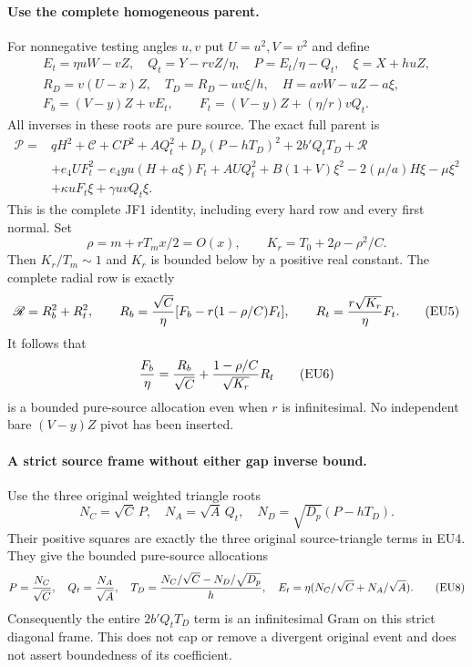 \paragraph{Use the complete homogeneous parent.}
For nonnegative testing angles $u,v$ put $U=u^2,V=v^2$ and define
\[
\begin{gathered}
 E_t=\eta uW-vZ,\quad Q_t=Y-rvZ/\eta,\quad
 P=E_t/\eta-Q_t,\quad \xi=X+huZ,\\
 R_D=v(U-x)Z,\quad T_D=R_D-uv\xi/h,\quad
 H=avW-uZ-a\xi,\\
 F_b=(V-y)Z+vE_t,\qquad
 F_t=(V-y)Z+(\eta/r)vQ_t.
\end{gathered}                                                    \tag{EU3}
\]
All inverses in these roots are pure source. The exact full parent is
\[
\begin{split}
\mathcal P={}&qH^2+\mathscr C
 +CP^2+AQ_t^2+D_p(P-hT_D)^2+2b'Q_tT_D+\mathscr R\\
 &+e_4UF_t^2-e_4yu(H+a\xi)F_t
 +AUQ_t^2+B(1+V)\xi^2-2(\mu/a)H\xi-\mu\xi^2\\
 &+\kappa uF_t\xi+\gamma uvQ_t\xi .
\end{split}                                                       \tag{EU4}
\]
This is the complete JF1 identity, including every hard row and every
first normal. Set
\[
 \rho=m+rT_mx/2=O(x),\qquad
 K_r=T_0+2\rho-\rho^2/C.
\]
Then $K_r/T_m\sim1$ and $K_r$ is bounded below by a positive
real constant. The complete radial row is exactly
\[
\mathscr R=R_b^2+R_t^2,\qquad
 R_b={\sqrt C\over\eta}[F_b-r(1-\rho/C)F_t],\qquad
 R_t={r\sqrt{K_r}\over\eta}F_t.                         \tag{EU5}
\]
It follows that
\[
 {F_b\over\eta}={R_b\over\sqrt C}
               +{1-\rho/C\over\sqrt{K_r}}R_t          \tag{EU6}
\]
is a bounded pure-source allocation even when $r$ is infinitesimal.
No independent bare $(V-y)Z$ pivot has been inserted.

\paragraph{A strict source frame without either gap inverse bound.}
Use the three original weighted triangle roots
\[
 N_C=\sqrt C\,P,\quad N_A=\sqrt A\,Q_t,\quad
 N_D=\sqrt{D_p}(P-hT_D).                               \tag{EU7}
\]
Their positive squares are exactly the three original source-triangle
terms in EU4. They give the bounded pure-source allocations
\[
 P={N_C\over\sqrt C},\quad Q_t={N_A\over\sqrt A},\quad
 T_D={N_C/\sqrt C-N_D/\sqrt{D_p}\over h},\quad
 E_t=\eta(N_C/\sqrt C+N_A/\sqrt A).                    \tag{EU8}
\]
Consequently the entire $2b'Q_tT_D$ term is an infinitesimal Gram
on this strict diagonal frame. This does not cap or remove a divergent
original event and does not assert boundedness of its coefficient.

